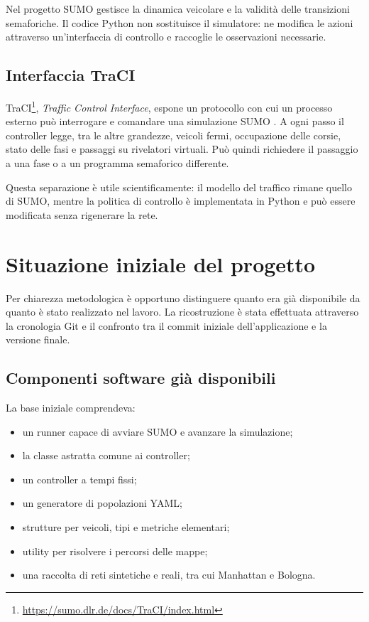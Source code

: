 \documentclass[12pt,a4paper,oneside]{report}
\numberwithin{equation}{chapter}
\begin{document}
Nel progetto SUMO gestisce la dinamica veicolare e la validità delle transizioni
semaforiche. Il codice Python non sostituisce il simulatore: ne modifica le
azioni attraverso un'interfaccia di controllo e raccoglie le osservazioni
necessarie.

\subsection{Interfaccia TraCI}

TraCI\footnote{\url{https://sumo.dlr.de/docs/TraCI/index.html}}, \emph{Traffic Control Interface}, espone un protocollo con cui un
processo esterno può interrogare e comandare una simulazione SUMO
\cite{wegener2008traci,tracidocs2026}. A ogni passo il controller legge, tra le
altre grandezze, veicoli fermi, occupazione delle corsie, stato delle fasi e
passaggi su rivelatori virtuali. Può quindi richiedere il passaggio a una fase
o a un programma semaforico differente.

Questa separazione è utile scientificamente: il modello del traffico rimane
quello di SUMO, mentre la politica di controllo è implementata in Python e può
essere modificata senza rigenerare la rete.

\section{Situazione iniziale del progetto}

Per chiarezza metodologica è opportuno distinguere quanto era già disponibile
da quanto è stato realizzato nel lavoro. La ricostruzione è stata effettuata
attraverso la cronologia Git e il confronto tra il commit iniziale
dell'applicazione e la versione finale.

\subsection{Componenti software già disponibili}

La base iniziale comprendeva:

\begin{itemize}
    \item un runner capace di avviare SUMO e avanzare la simulazione;
    \item la classe astratta comune ai controller;
    \item un controller a tempi fissi;
    \item un generatore di popolazioni YAML;
    \item strutture per veicoli, tipi e metriche elementari;
    \item utility per risolvere i percorsi delle mappe;
    \item una raccolta di reti sintetiche e reali, tra cui Manhattan e Bologna.
\end{itemize}
\end{document}
